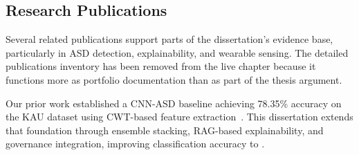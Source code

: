 \label{tab:thesis_structure}
\label{fig:diss_structure}

%

\label{tab:ch1_examiner_qa}

\subsection{Research Publications}
\label{sec:ch1_publications}

Several related publications support parts of the dissertation's evidence base, particularly in ASD detection, explainability, and wearable sensing. The detailed publications inventory has been removed from the live chapter because it functions more as portfolio documentation than as part of the thesis argument.

Our prior work established a CNN-ASD baseline achieving 78.35\% accuracy on the KAU dataset using CWT-based feature extraction~\cite{asthana2025cnnasd_icsit}. This dissertation extends that foundation through ensemble stacking, RAG-based explainability, and governance integration, improving classification accuracy to \asdacc{}.

\label{tab:ch1_publications}

